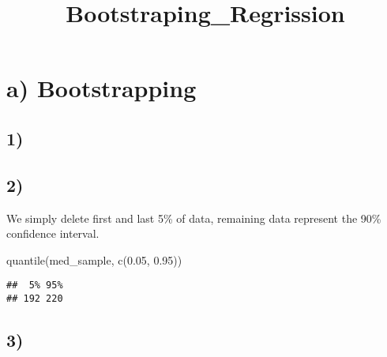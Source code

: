 \documentclass[
]{article}
\title{Bootstraping\_Regrission}
\author{}
\date{\vspace{-2.5em}}
\newenvironment{Shaded}{\begin{snugshade}}{\end{snugshade}}
\newcommand{\AttributeTok}[1]{\textcolor[rgb]{0.77,0.63,0.00}{#1}}
\newcommand{\DecValTok}[1]{\textcolor[rgb]{0.00,0.00,0.81}{#1}}
\newcommand{\FloatTok}[1]{\textcolor[rgb]{0.00,0.00,0.81}{#1}}
\newcommand{\FunctionTok}[1]{\textcolor[rgb]{0.00,0.00,0.00}{#1}}
\newcommand{\NormalTok}[1]{#1}
\newcommand{\OtherTok}[1]{\textcolor[rgb]{0.56,0.35,0.01}{#1}}
\newcommand{\SpecialCharTok}[1]{\textcolor[rgb]{0.00,0.00,0.00}{#1}}
\begin{document}
\maketitle

\hypertarget{a-bootstrapping}{%
\section{a) Bootstrapping}\label{a-bootstrapping}}

\hypertarget{section}{%
\subsection{1)}\label{section}}

\begin{Shaded}
\end{Shaded}

\hypertarget{section-1}{%
\subsection{2)}\label{section-1}}

We simply delete first and last 5\% of data, remaining data represent
the 90\% confidence interval.

\begin{Shaded}
\begin{Highlighting}[]
\FunctionTok{quantile}\NormalTok{(med\_sample, }\FunctionTok{c}\NormalTok{(}\FloatTok{0.05}\NormalTok{, }\FloatTok{0.95}\NormalTok{))}
\end{Highlighting}
\end{Shaded}

\begin{verbatim}
##  5% 95% 
## 192 220
\end{verbatim}

\hypertarget{section-2}{%
\subsection{3)}\label{section-2}}
\end{document}
